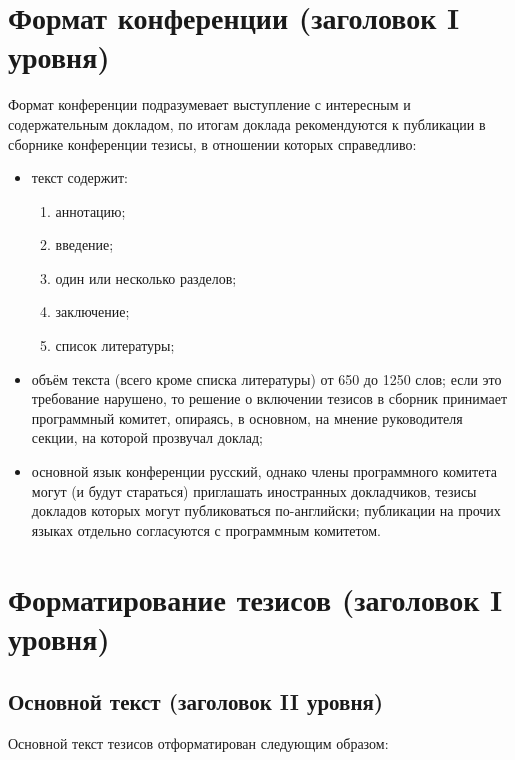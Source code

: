 \documentclass{spisok-article}
\begin{document}
\section{Формат конференции (заголовок I уровня)}

Формат конференции подразумевает выступление с интересным и
содержательным докладом, по итогам доклада рекомендуются к публикации
в сборнике конференции тезисы, в отношении которых справедливо:

\begin{itemize}
\item
  текст содержит:
  \begin{enumerate}
  \item
    аннотацию;
  \item
    введение;
  \item
    один или несколько разделов;
  \item
    заключение;
  \item
    список литературы;
  \end{enumerate}
\item
  объём текста (всего кроме списка литературы) от 650 до 1250 слов;
  если это требование нарушено, то решение о включении тезисов в
  сборник принимает программный комитет, опираясь, в основном, на
  мнение руководителя секции, на которой прозвучал доклад;
\item
  основной язык конференции русский, однако члены программного
  комитета могут (и будут стараться) приглашать иностранных
  докладчиков, тезисы докладов которых могут публиковаться
  по-английски; публикации на прочих языках отдельно согласуются с
  программным комитетом.
\end{itemize}

\section{Форматирование тезисов (заголовок I уровня)}

\subsection{Основной текст (заголовок II уровня)}

Основной текст тезисов отформатирован следующим образом:
\end{document}
